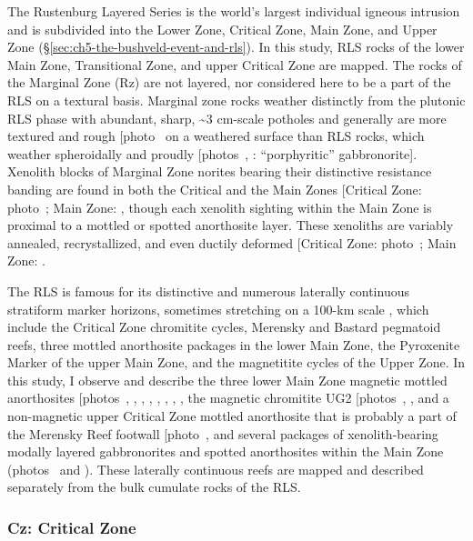The Rustenburg Layered Series is the world's largest individual igneous
intrusion \citep{cawthorn2015,latypovetal2022} and is subdivided into the Lower Zone, Critical Zone, Main Zone, and Upper Zone (\S\ref{sec:ch5-the-bushveld-event-and-rls}). In this study, RLS
rocks of the lower Main Zone, Transitional Zone, and upper Critical Zone
are mapped. The rocks of the Marginal Zone (Rz) are not layered, nor
considered here to be a part of the RLS on a textural basis. Marginal
zone rocks weather distinctly from the plutonic RLS phase with abundant,
sharp, \textasciitilde3 cm-scale potholes and generally are more
textured and rough {[}photo~\ChFivePhoto{36}{]} on a weathered surface than RLS rocks,
which weather spheroidally and proudly {[}photos~, : ``porphyritic''
gabbronorite{]}. Xenolith blocks of Marginal Zone norites bearing their
distinctive resistance banding are found in both the Critical and the
Main Zones {[}Critical Zone: photo~; Main Zone: \ChFivePhoto{91}{]}, though each
xenolith sighting within the Main Zone is proximal to a mottled or
spotted anorthosite layer. These xenoliths are variably annealed,
recrystallized, and even ductily deformed {[}Critical Zone: photo~;
Main Zone: \ChFivePhoto{84}{]}.

The RLS is famous for its distinctive and numerous laterally continuous
stratiform marker horizons, sometimes stretching on a 100-km scale
\citep{cawthorn2015}, which include the Critical Zone chromitite cycles,
Merensky and Bastard pegmatoid reefs, three mottled anorthosite packages
in the lower Main Zone, the Pyroxenite Marker of the upper Main Zone,
and the magnetitite cycles of the Upper Zone. In this study, I observe
and describe the three lower Main Zone magnetic mottled anorthosites
{[}photos~, , , , , , , \ChFivePhoto{111}{]}, the magnetic chromitite
UG2 {[}photos~, \ChFivePhoto{66}{]}, and a non-magnetic upper Critical Zone mottled
anorthosite that is probably a part of the Merensky Reef footwall
{[}photo~\ChFivePhoto{81}{]}, and several packages of xenolith-bearing modally layered
gabbronorites and spotted anorthosites within the Main Zone (photos~ and ).
These laterally continuous reefs are mapped and described separately
from the bulk cumulate rocks of the RLS.

\subsubsection{Cz: Critical Zone}
\label{sec:ch5-zone-cz}

